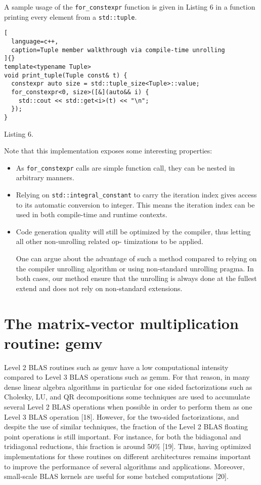 \documentclass[../../main.tex]{subfiles}
\begin{document}
A sample usage of the \lstinline{for_constexpr} function is given
in Listing 6 in a function printing every element from a
\lstinline{std::tuple}.

\begin{lstlisting}[
  language=c++,
  caption=Tuple member walkthrough via compile-time unrolling
]{}
template<typename Tuple>
void print_tuple(Tuple const& t) {
  constexpr auto size = std::tuple_size<Tuple>::value;
  for_constexpr<0, size>([&](auto&& i) {
    std::cout << std::get<i>(t) << "\n";
  });
}
\end{lstlisting}
Listing 6.

Note that this implementation exposes some interesting
properties:

\begin{itemize}
\item As \lstinline{for_constexpr} calls are simple function call, they
can be nested in arbitrary manners.

\item Relying on \lstinline{std::integral_constant} to carry the
iteration index gives access to its automatic conversion
to integer. This means the iteration index can be used in
both compile-time and runtime contexts.

\item Code generation quality will still be optimized by the
compiler, thus letting all other non-unrolling related op-
timizations to be applied.

One can argue about the advantage of such a method
compared to relying on the compiler unrolling algorithm
or using non-standard unrolling pragma. In both cases, our
method ensure that the unrolling is always done at the fullest
extend and does not rely on non-standard extensions.
\end{itemize}

\section{The matrix-vector multiplication routine: gemv}

Level 2 BLAS routines such as gemv have a low
computational intensity compared to Level 3 BLAS operations
such as gemm. For that reason, in many dense linear algebra
algorithms in particular for one sided factorizations such as
Cholesky, LU, and QR decompositions some techniques are
used to accumulate several Level 2 BLAS operations when
possible in order to perform them as one Level 3 BLAS
operation [18]. However, for the two-sided factorizations,
and despite the use of similar techniques, the fraction of the
Level 2 BLAS floating point operations is still important. For
instance, for both the bidiagonal and tridiagonal reductions,
this fraction is around 50\% [19]. Thus, having optimized
implementations for these routines on different architectures
remains important to improve the performance of several
algorithms and applications. Moreover, small-scale BLAS
kernels are useful for some batched computations [20].
\end{document}
